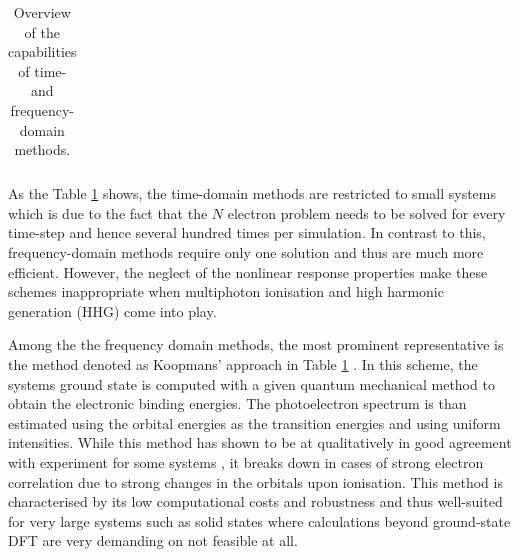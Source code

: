 {\begin{table}
\begin{small}
\begin{tabular}{|c|c|c|c|c|c|}
\hline
\end{tabular} \end{small}
\caption{Overview of the capabilities of time- and frequency-domain methods.}
\label{tab:PEScat}
\end{table} 
As the Table \ref{tab:PEScat} shows, the time-domain methods are restricted to small systems which is due to the fact that the $N$ electron problem needs to be solved for every time-step and hence several hundred times per simulation.
In contrast to this, frequency-domain methods require only one solution and thus are much more efficient. 
However, the neglect of the nonlinear response properties make these schemes inappropriate when multiphoton ionisation and high harmonic generation (HHG) come into play.

Among the the frequency domain methods, the most prominent representative is the method denoted as Koopmans' approach in Table \ref{tab:PEScat} \cite{Koerzd1,PottsHolland,dos,dos2}.
In this scheme, the systems ground state is computed with a given quantum mechanical method to obtain the electronic binding energies.
The photoelectron spectrum is than estimated using the orbital energies as the transition energies and using uniform intensities.
While this method has shown to be at qualitatively in good agreement with experiment for some systems \cite{Koerzd1,Koerzd2, EggerKronik,PottsHolland,YepesJaque}, 
it breaks down in cases of strong electron correlation \cite{2phcederbaum,2phcederbaum2} due to strong changes in the orbitals upon ionisation.
This method is characterised by its low computational costs and robustness and thus well-suited for very large systems such as solid states where calculations beyond ground-state DFT are very demanding on not feasible at all.

}
